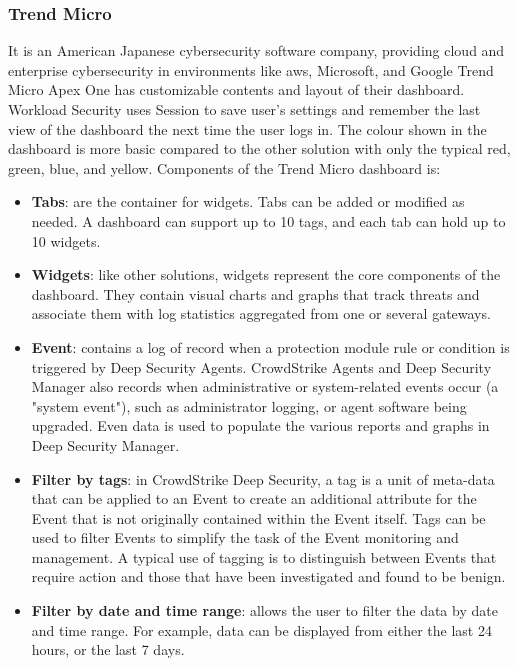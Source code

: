 



\subsubsection{Trend Micro} %
It is an American Japanese cybersecurity software company, providing cloud and enterprise cybersecurity in
environments like \acrshort{aws}, Microsoft, and Google Trend Micro Apex One has customizable contents and
layout of their dashboard. Workload Security uses Session to save user's settings and remember the last view
of the dashboard the next time the user logs in. The colour shown in the dashboard is more basic compared to
the other solution with only the typical red, green, blue, and yellow. Components of the
Trend Micro dashboard is:

\begin{itemize}
      \item \textbf{Tabs}: are the container for widgets. Tabs can be added or modified as needed. A dashboard
            can support up to 10 tags, and each tab can hold up to 10 widgets.
      \item \textbf{Widgets}: like other solutions, widgets represent the core components of the dashboard.
            They contain visual charts and graphs that track threats and associate them with log statistics
            aggregated from one or several gateways.
      \item \textbf{Event}: contains a log of record when a protection module rule or condition is triggered
            by Deep Security Agents. CrowdStrike Agents and Deep Security Manager also records when
            administrative or system-related events occur (a "system event"), such as administrator logging,
            or agent software being upgraded. Even data is used to populate the various reports and graphs
            in Deep Security Manager.
      \item \textbf{Filter by tags}: in CrowdStrike Deep Security\textregistered, a tag is a unit of meta-data
            that can be applied to an Event to create an additional attribute for the Event that is not
            originally contained within the Event itself. Tags can be used to filter Events to simplify
            the task of the Event monitoring and management. A typical use of tagging is to distinguish between
            Events that require action and those that have been investigated and found to be benign.
      \item \textbf{Filter by date and time range}: allows the user to filter the data by date and time range.
            For example, data can be displayed from either the last 24 hours, or the last 7 days.
\end{itemize}


